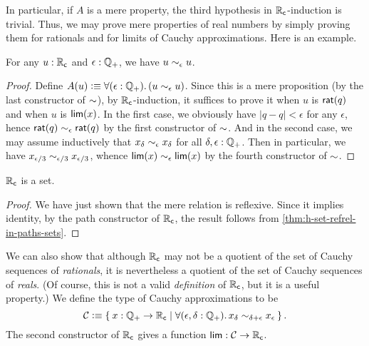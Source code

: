 In particular, if $A$ is a mere property, the third hypothesis in $\mathbb{R}_\mathsf{c}$-induction is trivial.
Thus, we may prove mere properties of real numbers by simply proving them for rationals and for limits of Cauchy approximations.
Here is an example.

\begin{lem}
  For any $u:\mathbb{R}_\mathsf{c}$ and $\epsilon:\mathbb{Q}_{+}$, we have $u\sim_{\epsilon} u$.
\end{lem}
\begin{proof}
  Define $A(u) \defeq \fall{\epsilon:\Qp} (u\close\epsilon u)$.
  Since this is a mere proposition (by the last constructor of $\mathord\sim$), by $\mathbb{R}_\mathsf{c}$-induction, it suffices to prove it when $u$ is $\mathsf{rat}(q)$ and when $u$ is $\mathsf{lim}(x)$.
  In the first case, we obviously have $|q-q|<\epsilon$ for any $\epsilon$, hence $\mathsf{rat}(q) \sim_{\epsilon} \mathsf{rat}(q)$ by the first constructor of $\mathord\sim$.
  And in the second case, we may assume inductively that $x_\delta \sim_{\epsilon} x_\delta$ for all $\delta,\epsilon:\mathbb{Q}_{+}$.
  Then in particular, we have $x_{\epsilon/3} \sim_{\epsilon/3} x_{\epsilon/3}$, whence $\mathsf{lim}(x) \sim_{\epsilon} \mathsf{lim}(x)$ by the fourth constructor of $\mathord\sim$.
\end{proof}

\begin{thm}\label{thm:Cauchy-reals-are-a-set}
  $\mathbb{R}_\mathsf{c}$ is a set.
\end{thm}
\begin{proof}
  We have just shown that the mere relation
  is reflexive.
  Since it implies identity, by the path constructor of $\mathbb{R}_\mathsf{c}$, the result follows from \autoref{thm:h-set-refrel-in-paths-sets}.
\end{proof}

We can also show that although $\mathbb{R}_\mathsf{c}$ may not be a quotient of the set of Cauchy sequences of \emph{rationals}, it is nevertheless a quotient of the set of Cauchy sequences of \emph{reals}.
(Of course, this is not a valid \emph{definition} of $\mathbb{R}_\mathsf{c}$, but it is a useful property.)
We define the type of Cauchy approximations to be
% 
%
%
\begin{equation*}
  \CAP \defeq
  \setof{ x : \Qp \to \RC |
    \fall{\epsilon, \delta : \Qp} x_\delta \close{\delta + \epsilon} x_\epsilon
  }.
\end{equation*}
The second constructor of $\mathbb{R}_\mathsf{c}$ gives a function $\mathsf{lim}:\mathcal{C}\to\mathbb{R}_\mathsf{c}$.

